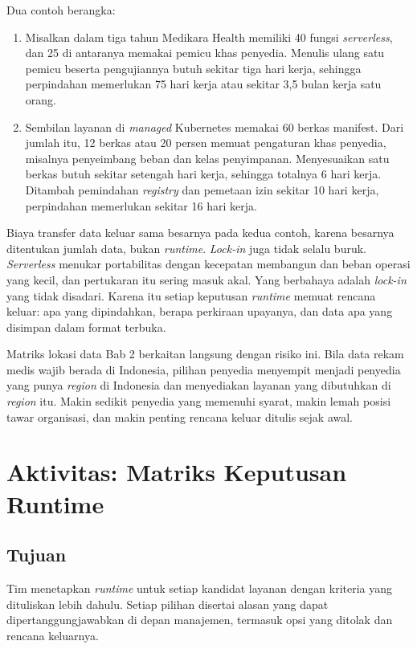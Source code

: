 Dua contoh berangka:
\begin{enumerate}
  \item Misalkan dalam tiga tahun Medikara Health memiliki 40 fungsi \textit{serverless}, dan 25 di
        antaranya memakai pemicu khas penyedia. Menulis ulang satu pemicu beserta pengujiannya
        butuh sekitar tiga hari kerja, sehingga perpindahan memerlukan 75 hari kerja atau sekitar
        3,5 bulan kerja satu orang.
  \item Sembilan layanan di \textit{managed} Kubernetes memakai 60 berkas manifest. Dari jumlah
        itu, 12 berkas atau 20 persen memuat pengaturan khas penyedia, misalnya penyeimbang beban
        dan kelas penyimpanan. Menyesuaikan satu berkas butuh sekitar setengah hari kerja, sehingga
        totalnya 6 hari kerja. Ditambah pemindahan \textit{registry} dan pemetaan izin sekitar 10
        hari kerja, perpindahan memerlukan sekitar 16 hari kerja.
\end{enumerate}

Biaya transfer data keluar sama besarnya pada kedua contoh, karena besarnya ditentukan jumlah data,
bukan \textit{runtime}. \textit{Lock-in} juga tidak selalu buruk. \textit{Serverless} menukar
portabilitas dengan kecepatan membangun dan beban operasi yang kecil, dan pertukaran itu sering
masuk akal. Yang berbahaya adalah \textit{lock-in} yang tidak disadari. Karena itu setiap keputusan
\textit{runtime} memuat rencana keluar: apa yang dipindahkan, berapa perkiraan upayanya, dan data
apa yang disimpan dalam format terbuka.

Matriks lokasi data Bab 2 berkaitan langsung dengan risiko ini. Bila data rekam medis wajib berada
di Indonesia, pilihan penyedia menyempit menjadi penyedia yang punya \textit{region} di Indonesia
dan menyediakan layanan yang dibutuhkan di \textit{region} itu. Makin sedikit penyedia yang
memenuhi syarat, makin lemah posisi tawar organisasi, dan makin penting rencana keluar ditulis
sejak awal.

\section{Aktivitas: Matriks Keputusan Runtime}
\label{sec:ch08-aktivitas}

\subsection*{Tujuan}

Tim menetapkan \textit{runtime} untuk setiap kandidat layanan dengan kriteria yang dituliskan lebih
dahulu. Setiap pilihan disertai alasan yang dapat dipertanggungjawabkan di depan manajemen, termasuk
opsi yang ditolak dan rencana keluarnya.

